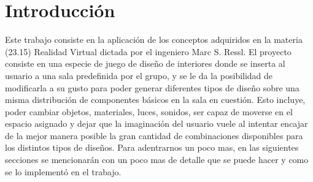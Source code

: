 \section{Introducción}

Este trabajo consiste en la aplicación de los conceptos adquiridos en la materia (23.15) Realidad Virtual dictada por el ingeniero Marc S. Ressl. El proyecto consiste en una especie de juego de diseño de interiores donde se inserta al usuario a una sala predefinida por el grupo, y se le da la posibilidad de modificarla a su gusto para poder generar diferentes tipos de diseño sobre una misma distribución de componentes básicos en la sala en cuestión. Esto incluye, poder cambiar objetos, materiales, luces, sonidos, ser capaz de moverse en el espacio asignado y dejar que la imaginación del usuario vuele al intentar encajar de la mejor manera posible la gran cantidad de combinaciones disponibles para los distintos tipos de diseños.
Para adentrarnos un poco mas, en las siguientes secciones se mencionarán con un poco mas de detalle que se puede hacer y como se lo implementó en el trabajo.